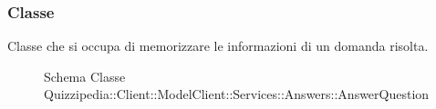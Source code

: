 \subsubsection{Classe }
Classe che si occupa di memorizzare le informazioni di un domanda risolta.
\begin{figure}[H]
\centering
\noindent{}
\caption[Schema Classe AnswerQuestion]{Schema Classe Quizzipedia::Client::ModelClient::Services::Answers::AnswerQuestion}
\end{figure}
